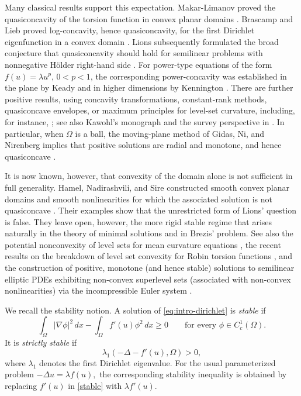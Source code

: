 \documentclass[reqno,12pt]{amsart}
\numberwithin{equation}{section}
\theoremstyle{remark}
\begin{document}
Many classical results support this expectation.  Makar-Limanov proved the
quasiconcavity of the torsion function in convex planar domains \cite{M1971}.
Brascamp and Lieb proved log-concavity, hence quasiconcavity, for the first Dirichlet eigenfunction in a convex domain \cite{BL1975}.  Lions subsequently formulated the broad conjecture that quasiconcavity should hold for semilinear problems with nonnegative H\"older right-hand side \cite[Remark 3]{L1981}.  For power-type equations of the form $f(u)=\lambda u^p$, $0<p<1$, the corresponding power-concavity was established in the plane by Keady \cite{Kea1985} and in higher dimensions by Kennington \cite{Ken1985}.  There are further positive results, using
concavity transformations, constant-rank methods, quasiconcave envelopes, or maximum principles for level-set curvature, including, for instance,  \cite{APP1981,CJ1982,Ko1983,K1983,K1985,K1986,KL1987,GP1993,L1994,ALL1997,CS2003,GG2004,BGMX2011,X2011,MSY2012};
see also Kawohl's monograph \cite{K19852} and the survey perspective in \cite{A2015}.  In particular, when $\Omega$ is a ball, the moving-plane method of Gidas, Ni, and Nirenberg implies that positive solutions are radial and monotone, and hence quasiconcave \cite{GNN1979}.

It is now known, however, that convexity of the domain alone is not sufficient in full generality.  Hamel, Nadirashvili, and Sire constructed smooth convex planar domains and smooth nonlinearities for which the associated solution is not quasiconcave \cite{HNS2016}.  Their examples show that the unrestricted form of Lions' question is false.  They leave open, however, the more rigid stable regime that arises naturally in the theory of minimal solutions and in
Brezis' problem. See also the potential nonconvexity of level sets for mean curvature equations \cite{W2014}, the recent results on the breakdown of level set convexity for Robin torsion functions \cite{LWY2025}, and the construction of positive, monotone (and hence stable) solutions to semilinear elliptic PDEs exhibiting non-convex superlevel sets (associated with non-convex nonlinearities) via the incompressible Euler system \cite{GRXX2025}. 

We recall the stability notion.  A solution of \eqref{eq:intro-dirichlet} is
\emph{stable} if
\begin{equation}\label{stable}
\int_\Omega |\nabla\phi|^2\,dx-
\int_\Omega f'(u)\phi^2\,dx\ge0
\qquad\text{for every }\phi\in C_c^1(\Omega).
\end{equation}
It is \emph{strictly stable} if
$$
 \lambda_1(-\Delta-f'(u),\Omega)>0,
$$
where $\lambda_1$ denotes the first Dirichlet eigenvalue.  For the usual parameterized
problem $-\Delta u=\lambda f(u),$ 
the corresponding stability inequality is
obtained by replacing $f'(u)$ in \eqref{stable} with $\lambda f'(u)$.
\end{document}
